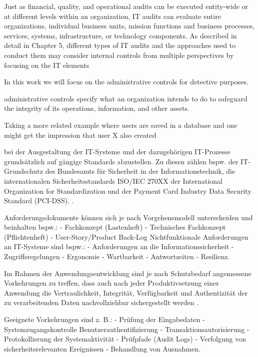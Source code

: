 Just as financial, quality, and operational audits can be executed entity-wide or at
different levels within an organization, IT audits can evaluate entire organizations,
individual business units, mission functions and business processes, services, systems, infrastructure, or technology components. As described in detail in Chapter 5,
different types of IT audits and the approaches used to conduct them may consider internal controls from multiple perspectives by focusing on the IT elements


In this work we will focus on the administrative controls for detective purposes.

administrative controls specify what an organization intends to do to safeguard the integrity of its operations, information, and other assets.


Taking a more related example where users are saved in a database and one might get the impression that user X also created 

bei der Ausgestaltung der IT-Systeme und der dazugehörigen IT-Prozesse grundsätzlich auf gängige Standards abzustellen. Zu diesen zählen bspw. der IT-Grundschutz des Bundesamts für Sicherheit in der Informationstechnik, die
internationalen Sicherheitsstandards ISO/IEC 270XX der International Organization for Standardization und der Payment Card Industry Data Security
Standard (PCI-DSS). \citep{BaFinZAIT}.

Anforderungsdokumente können sich je nach Vorgehensmodell unterscheiden und beinhalten bspw.:
- Fachkonzept (Lastenheft)
- Technisches Fachkonzept (Pflichtenheft)
- User-Story/Product Back-Log
Nichtfunktionale Anforderungen an IT-Systeme sind bspw.:
- Anforderungen an die Informationssicherheit
- Zugriffsregelungen
- Ergonomie
- Wartbarkeit
- Antwortzeiten
- Resilienz.

Im Rahmen der Anwendungsentwicklung sind je nach Schutzbedarf
angemessene Vorkehrungen zu treffen, dass auch nach jeder
Produktivsetzung einer Anwendung die Vertraulichkeit, Integrität, Verfügbarkeit und Authentizität der zu verarbeitenden Daten nachvollziehbar sichergestellt werden \citep{BaFinZAIT}.

Geeignete Vorkehrungen sind z. B.:
- Prüfung der Eingabedaten
- Systemzugangskontrolle Benutzerauthentifizierung
- Transaktionsautorisierung
- Protokollierung der Systemaktivität
- Prüfpfade (Audit Logs)
- Verfolgung von sicherheitsrelevanten Ereignissen
- Behandlung von Ausnahmen.


